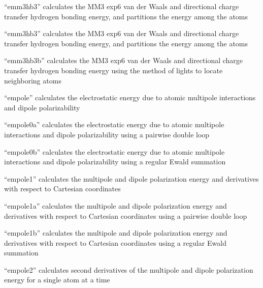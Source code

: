 \documentclass[letterpaper,11pt,english]{sphinxmanual}
\begin{document}

“emm3hb3” calculates the MM3 exp\sphinxhyphen{}6 van der Waals and directional charge transfer hydrogen bonding energy, and partitions the energy among the atoms


“emm3hb3” calculates the MM3 exp\sphinxhyphen{}6 van der Waals and directional charge transfer hydrogen bonding energy, and partitions the energy among the atoms


“emm3hb3b” calculates the MM3 exp\sphinxhyphen{}6 van der Waals and directional charge transfer hydrogen bonding energy using the method of lights to locate neighboring atoms


“empole” calculates the electrostatic energy due to atomic multipole interactions and dipole polarizability


“empole0a” calculates the electrostatic energy due to atomic multipole interactions and dipole polarizability using a pairwise double loop


“empole0b” calculates the electrostatic energy due to atomic multipole interactions and dipole polarizability using a regular Ewald summation


“empole1” calculates the multipole and dipole polarization energy and derivatives with respect to Cartesian coordinates


“empole1a” calculates the multipole and dipole polarization energy and derivatives with respect to Cartesian coordinates using a pairwise double loop


“empole1b” calculates the multipole and dipole polarization energy and derivatives with respect to Cartesian coordinates using a regular Ewald summation


“empole2” calculates second derivatives of the multipole and dipole polarization energy for a single atom at a time
\end{document}
